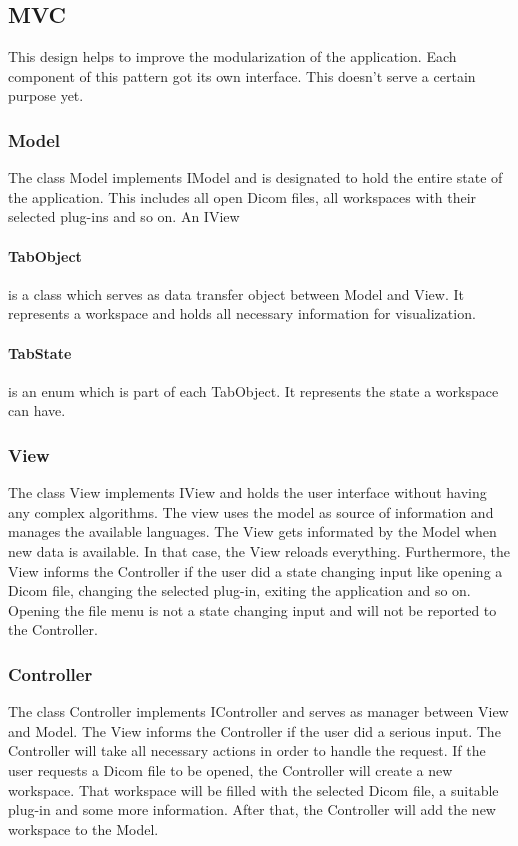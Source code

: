 \subsection{MVC}
This design helps to improve the modularization of the application. Each component of this pattern got its own interface. This doesn't serve a certain purpose yet.

\subsubsection{Model}
The class Model implements IModel and is designated to hold the entire state of the application. This includes all open Dicom files, all workspaces with their selected plug-ins and so on. An IView
\paragraph{TabObject} is a class which serves as data transfer object between Model and View. It represents a workspace and holds all necessary information for visualization.
\paragraph{TabState} is an enum which is part of each TabObject. It represents the state a workspace can have.

\subsubsection{View}
The class View implements IView and holds the user interface without having any complex algorithms. The view uses the model as source of information and manages the available languages. The View gets informated by the Model when new data is available. In that case, the View reloads everything. Furthermore, the View informs the Controller if the user did a state changing input like opening a Dicom file, changing the selected plug-in, exiting the application and so on. Opening the file menu is not a state changing input and will not be reported to the Controller.

\subsubsection{Controller}
The class Controller implements IController and serves as manager between View and Model. The View informs the Controller if the user did a serious input. The Controller will take all necessary actions in order to handle the request. If the user requests a Dicom file to be opened, the Controller will create a new workspace. That workspace will be filled with the selected Dicom file, a suitable plug-in and some more information. After that, the Controller will add the new workspace to the Model.

